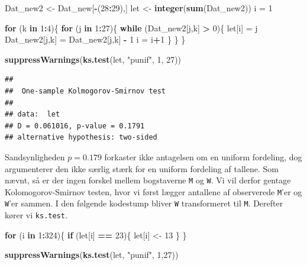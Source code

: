 \documentclass[]{article}
\newenvironment{Shaded}{\begin{snugshade}}{\end{snugshade}}
\newcommand{\KeywordTok}[1]{\textcolor[rgb]{0.13,0.29,0.53}{\textbf{#1}}}
\newcommand{\DecValTok}[1]{\textcolor[rgb]{0.00,0.00,0.81}{#1}}
\newcommand{\StringTok}[1]{\textcolor[rgb]{0.31,0.60,0.02}{#1}}
\newcommand{\ControlFlowTok}[1]{\textcolor[rgb]{0.13,0.29,0.53}{\textbf{#1}}}
\newcommand{\OperatorTok}[1]{\textcolor[rgb]{0.81,0.36,0.00}{\textbf{#1}}}
\newcommand{\NormalTok}[1]{#1}
\begin{document}
\begin{Shaded}
\begin{Highlighting}[]
\NormalTok{Dat_new2 <-}\StringTok{ }\NormalTok{Dat_new[}\OperatorTok{-}\NormalTok{(}\DecValTok{28}\OperatorTok{:}\DecValTok{29}\NormalTok{),]}
\NormalTok{let <-}\StringTok{ }\KeywordTok{integer}\NormalTok{(}\KeywordTok{sum}\NormalTok{(Dat_new2))}
\NormalTok{i =}\StringTok{ }\DecValTok{1}

\ControlFlowTok{for}\NormalTok{ (k }\ControlFlowTok{in} \DecValTok{1}\OperatorTok{:}\DecValTok{4}\NormalTok{)\{}
  \ControlFlowTok{for}\NormalTok{ (j }\ControlFlowTok{in} \DecValTok{1}\OperatorTok{:}\DecValTok{27}\NormalTok{)\{}
    \ControlFlowTok{while}\NormalTok{ (Dat_new2[j,k] }\OperatorTok{>}\StringTok{ }\DecValTok{0}\NormalTok{)\{}
\NormalTok{      let[i] =}\StringTok{ }\NormalTok{j}
\NormalTok{      Dat_new2[j,k] =}\StringTok{ }\NormalTok{Dat_new2[j,k] }\OperatorTok{-}\StringTok{ }\DecValTok{1}
\NormalTok{      i =}\StringTok{ }\NormalTok{i}\OperatorTok{+}\DecValTok{1}
\NormalTok{    \}}
\NormalTok{  \}}
\NormalTok{\}}

\KeywordTok{suppressWarnings}\NormalTok{(}\KeywordTok{ks.test}\NormalTok{(let, }\StringTok{"punif"}\NormalTok{, }\DecValTok{1}\NormalTok{, }\DecValTok{27}\NormalTok{))}
\end{Highlighting}
\end{Shaded}

\begin{verbatim}
## 
##  One-sample Kolmogorov-Smirnov test
## 
## data:  let
## D = 0.061016, p-value = 0.1791
## alternative hypothesis: two-sided
\end{verbatim}

Sandsynligheden \(p = 0.179\) forkaster ikke antagelsen om en uniform
fordeling, dog argumenterer den ikke særlig stærk for en uniform
fordeling af tallene.\newline
Som nævnt, så er der ingen forskel mellem bogstaverne \texttt{M} og
\texttt{W}. Vi vil derfor gentage Kolomogorov-Smirnov testen, hvor vi
først lægger antallene af observerede \texttt{M}'er og \texttt{W}'er
sammen. I den følgende kodestump bliver \texttt{W} transformeret til
\texttt{M}. Derefter kører vi \texttt{ks.test}.

\begin{Shaded}
\begin{Highlighting}[]
\ControlFlowTok{for}\NormalTok{ (i }\ControlFlowTok{in} \DecValTok{1}\OperatorTok{:}\DecValTok{324}\NormalTok{)\{}
  \ControlFlowTok{if}\NormalTok{ (let[i] }\OperatorTok{==}\StringTok{ }\DecValTok{23}\NormalTok{)\{}
\NormalTok{    let[i] <-}\StringTok{ }\DecValTok{13}
\NormalTok{  \}}
\NormalTok{\}}

\KeywordTok{suppressWarnings}\NormalTok{(}\KeywordTok{ks.test}\NormalTok{(let, }\StringTok{"punif"}\NormalTok{, }\DecValTok{1}\NormalTok{,}\DecValTok{27}\NormalTok{))}
\end{Highlighting}
\end{Shaded}
\end{document}
